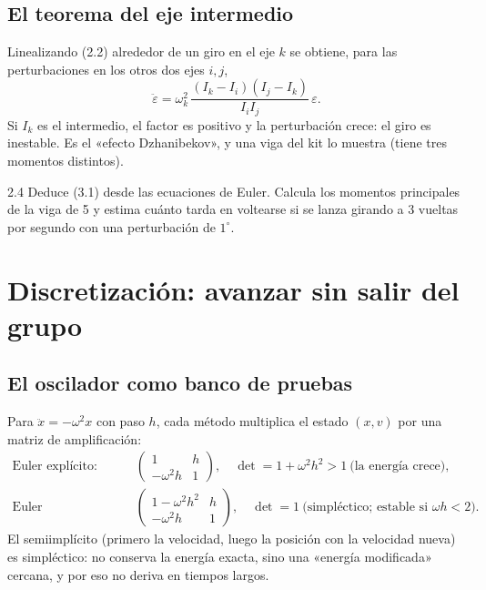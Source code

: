 \documentclass[11pt,a4paper]{article}
\begin{document}
\subsection{El teorema del eje intermedio}
Linealizando (2.2) alrededor de un giro en el eje $k$ se obtiene, para las perturbaciones en los otros dos ejes $i,j$,
\begin{equation}
  \ddot\varepsilon = \omega_k^2\,\frac{(I_k - I_i)(I_j - I_k)}{I_iI_j}\,\varepsilon .
\end{equation}
Si $I_k$ es el intermedio, el factor es positivo y la perturbación crece: el giro es inestable. Es el «efecto
Dzhanibekov», y una viga del kit lo muestra (tiene tres momentos distintos).

\begin{ejercicio}{2.4}
Deduce (3.1) desde las ecuaciones de Euler. Calcula los momentos principales de la viga de 5 y estima cuánto tarda en
voltearse si se lanza girando a 3 vueltas por segundo con una perturbación de $1^\circ$.
\end{ejercicio}

\section{Discretización: avanzar sin salir del grupo}

\subsection{El oscilador como banco de pruebas}
Para $\ddot x = -\omega^2x$ con paso $h$, cada método multiplica el estado $(x, v)$ por una matriz de amplificación:
\begin{align}
  \text{Euler explícito:}&\quad \begin{pmatrix}1 & h\\ -\omega^2h & 1\end{pmatrix},\quad \det = 1 + \omega^2h^2 > 1
    \ \text{(la energía crece)},\\
  \text{Euler semiimplícito:}&\quad \begin{pmatrix}1-\omega^2h^2 & h\\ -\omega^2h & 1\end{pmatrix},\quad \det = 1
    \ \text{(simpléctico; estable si } \omega h < 2).
\end{align}
El semiimplícito (primero la velocidad, luego la posición con la velocidad nueva) es simpléctico: no conserva la
energía exacta, sino una «energía modificada» cercana, y por eso no deriva en tiempos largos.
\end{document}
